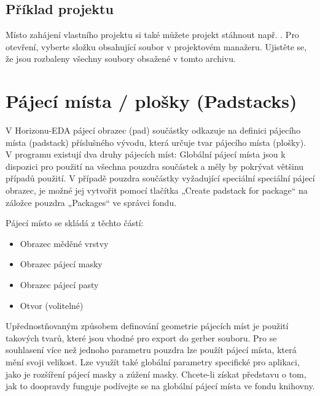 \documentclass[letterpaper,10pt,czech]{sphinxmanual}
\begin{document}
\section{Příklad projektu}
\label{\detokenize{getting-started:priklad-projektu}}
Místo zahájení vlastního projektu si také můžete projekt stáhnout např. . Pro otevření, vyberte složku obsahující soubor  v projektovém manažeru. Ujistěte se, že jsou rozbaleny všechny soubory obsažené v tomto archivu.


\chapter{Pájecí místa / plošky (Padstacks)}
\label{\detokenize{padstacks:pajeci-mista-plosky-padstacks}}\label{\detokenize{padstacks::doc}}
V Horizonu-EDA pájecí obrazec (pad) součástky odkazuje na definici pájecího místa (padstack) příslušného vývodu, která určuje tvar pájecího místa (plošky). V programu existují dva druhy pájecích míst:
Globální pájecí místa jsou k dispozici pro použití na všechna pouzdra součástek a měly by pokrývat většinu případů použití. V případě pouzdra součástky vyžadující speciální speciální pájecí obrazec, je možné jej vytvořit pomocí tlačítka „Create padstack for package“ na záložce pouzdra „Packages“ ve správci fondu.

Pájecí místo se skládá z těchto částí:
\begin{itemize}
\item {} 
Obrazec měděné vrstvy

\item {} 
Obrazec pájecí masky

\item {} 
Obrazec pájecí pasty

\item {} 
Otvor (volitelné)

\end{itemize}

Upřednostňovaným způsobem definování geometrie pájecích míst je použití takových tvarů, které jsou vhodné pro export do gerber souboru. Pro se souhlasení více než jednoho parametru pouzdra lze použít pájecí místa, která mění svoji velikost. Lze využít také globální parametry specifické pro aplikaci, jako je rozšíření pájecí masky a zúžení masky. Chcete-li získat představu o tom, jak to doopravdy funguje podívejte se na globální pájecí místa ve fondu knihovny.
\end{document}
